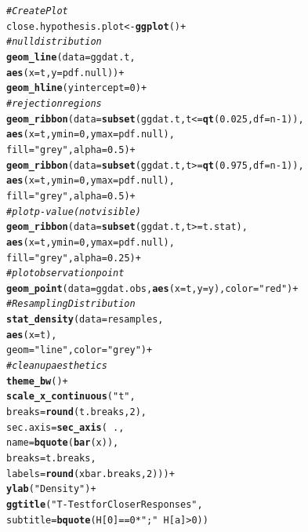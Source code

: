 \documentclass{article}\usepackage[]{graphicx}\usepackage[]{xcolor}
\makeatletter
\newcommand{\hlnum}[1]{\textcolor[rgb]{0.686,0.059,0.569}{#1}}%
\newcommand{\hlsng}[1]{\textcolor[rgb]{0.192,0.494,0.8}{#1}}%
\newcommand{\hlcom}[1]{\textcolor[rgb]{0.678,0.584,0.686}{\textit{#1}}}%
\newcommand{\hlopt}[1]{\textcolor[rgb]{0,0,0}{#1}}%
\newcommand{\hldef}[1]{\textcolor[rgb]{0.345,0.345,0.345}{#1}}%
\newcommand{\hlkwb}[1]{\textcolor[rgb]{0.69,0.353,0.396}{#1}}%
\newcommand{\hlkwc}[1]{\textcolor[rgb]{0.333,0.667,0.333}{#1}}%
\newcommand{\hlkwd}[1]{\textcolor[rgb]{0.737,0.353,0.396}{\textbf{#1}}}%
\newenvironment{kframe}{%
 \def\at@end@of@kframe{}%
 \ifinner\ifhmode%
  \def\at@end@of@kframe{\end{minipage}}%
  \begin{minipage}{\columnwidth}%
 \fi\fi%
 \def\FrameCommand##1{\hskip\@totalleftmargin \hskip-\fboxsep
 \colorbox{shadecolor}{##1}\hskip-\fboxsep
     \hskip-\linewidth \hskip-\@totalleftmargin \hskip\columnwidth}%
 \MakeFramed {\advance\hsize-\width
   \@totalleftmargin\z@ \linewidth\hsize
   \@setminipage}}%
 {\par\unskip\endMakeFramed%
 \at@end@of@kframe}
\newenvironment{knitrout}{}{} %
\makeatother
\begin{document}
\begin{enumerate}
\begin{enumerate}
\begin{knitrout}
\begin{kframe}
\begin{alltt}
\hlcom{# Create Plot}
\hldef{close.hypothesis.plot} \hlkwb{<-} \hlkwd{ggplot}\hldef{()} \hlopt{+}
  \hlcom{# null distribution}
  \hlkwd{geom_line}\hldef{(}\hlkwc{data}\hldef{=ggdat.t,}
            \hlkwd{aes}\hldef{(}\hlkwc{x}\hldef{=t,} \hlkwc{y}\hldef{=pdf.null))}\hlopt{+}
  \hlkwd{geom_hline}\hldef{(}\hlkwc{yintercept}\hldef{=}\hlnum{0}\hldef{)}\hlopt{+}
  \hlcom{# rejection regions}
  \hlkwd{geom_ribbon}\hldef{(}\hlkwc{data}\hldef{=}\hlkwd{subset}\hldef{(ggdat.t, t}\hlopt{<=}\hlkwd{qt}\hldef{(}\hlnum{0.025}\hldef{,} \hlkwc{df}\hldef{=n}\hlopt{-}\hlnum{1}\hldef{)),}
              \hlkwd{aes}\hldef{(}\hlkwc{x}\hldef{=t,} \hlkwc{ymin}\hldef{=}\hlnum{0}\hldef{,} \hlkwc{ymax}\hldef{=pdf.null),}
              \hlkwc{fill}\hldef{=}\hlsng{"grey"}\hldef{,} \hlkwc{alpha}\hldef{=}\hlnum{0.5}\hldef{)}\hlopt{+}
  \hlkwd{geom_ribbon}\hldef{(}\hlkwc{data}\hldef{=}\hlkwd{subset}\hldef{(ggdat.t, t}\hlopt{>=}\hlkwd{qt}\hldef{(}\hlnum{0.975}\hldef{,} \hlkwc{df}\hldef{=n}\hlopt{-}\hlnum{1}\hldef{)),}
              \hlkwd{aes}\hldef{(}\hlkwc{x}\hldef{=t,} \hlkwc{ymin}\hldef{=}\hlnum{0}\hldef{,} \hlkwc{ymax}\hldef{=pdf.null),}
              \hlkwc{fill}\hldef{=}\hlsng{"grey"}\hldef{,} \hlkwc{alpha}\hldef{=}\hlnum{0.5}\hldef{)}\hlopt{+}
  \hlcom{# plot p-value (not visible)}
  \hlkwd{geom_ribbon}\hldef{(}\hlkwc{data}\hldef{=}\hlkwd{subset}\hldef{(ggdat.t, t}\hlopt{>=}\hldef{t.stat),}
              \hlkwd{aes}\hldef{(}\hlkwc{x}\hldef{=t,} \hlkwc{ymin}\hldef{=}\hlnum{0}\hldef{,} \hlkwc{ymax}\hldef{=pdf.null),}
              \hlkwc{fill}\hldef{=}\hlsng{"grey"}\hldef{,} \hlkwc{alpha}\hldef{=}\hlnum{0.25}\hldef{)}\hlopt{+}
  \hlcom{# plot observation point}
  \hlkwd{geom_point}\hldef{(}\hlkwc{data}\hldef{=ggdat.obs,} \hlkwd{aes}\hldef{(}\hlkwc{x}\hldef{=t,} \hlkwc{y}\hldef{=y),} \hlkwc{color}\hldef{=}\hlsng{"red"}\hldef{)}\hlopt{+}
  \hlcom{# Resampling Distribution}
  \hlkwd{stat_density}\hldef{(}\hlkwc{data}\hldef{=resamples,}
               \hlkwd{aes}\hldef{(}\hlkwc{x}\hldef{=t),}
               \hlkwc{geom}\hldef{=}\hlsng{"line"}\hldef{,} \hlkwc{color}\hldef{=}\hlsng{"grey"}\hldef{)}\hlopt{+}
  \hlcom{# clean up aesthetics}
  \hlkwd{theme_bw}\hldef{()}\hlopt{+}
  \hlkwd{scale_x_continuous}\hldef{(}\hlsng{"t"}\hldef{,}
                     \hlkwc{breaks} \hldef{=} \hlkwd{round}\hldef{(t.breaks,}\hlnum{2}\hldef{),}
                     \hlkwc{sec.axis} \hldef{=} \hlkwd{sec_axis}\hldef{(}\hlopt{~}\hldef{.,}
                                         \hlkwc{name} \hldef{=} \hlkwd{bquote}\hldef{(}\hlkwd{bar}\hldef{(x)),}
                                         \hlkwc{breaks} \hldef{= t.breaks,}
                                         \hlkwc{labels} \hldef{=} \hlkwd{round}\hldef{(xbar.breaks,}\hlnum{2}\hldef{)))}\hlopt{+}
  \hlkwd{ylab}\hldef{(}\hlsng{"Density"}\hldef{)}\hlopt{+}
  \hlkwd{ggtitle}\hldef{(}\hlsng{"T-Test for Closer Responses"}\hldef{,}
          \hlkwc{subtitle}\hldef{=}\hlkwd{bquote}\hldef{(H[}\hlnum{0}\hldef{]}\hlopt{==}\hlnum{0}\hlopt{*}\hlsng{";"}\hlopt{~}\hldef{H[a]}\hlopt{>}\hlnum{0}\hldef{))}
\end{alltt}
\end{kframe}
\end{knitrout}


\end{enumerate}
\end{enumerate}
\end{document}
